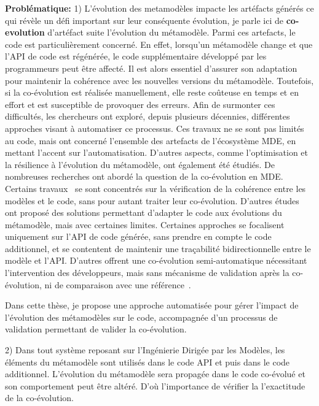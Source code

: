 \textbf{Problématique:} 1) L’évolution des metamodèles impacte les artéfacts générés ce qui révèle un défi important sur leur conséquente évolution, je parle ici de \textbf{co-evolution} d'artéfact suite  l'évolution du métamodèle. Parmi ces artefacts, le code est particulièrement concerné. En effet, lorsqu’un métamodèle change et que l’API de code est régénérée, le code supplémentaire développé par les programmeurs peut être affecté. Il est alors essentiel d’assurer son adaptation pour maintenir la cohérence avec les nouvelles versions du métamodèle. Toutefois, si la co-évolution est réalisée manuellement, elle reste coûteuse en temps et en effort et est susceptible de provoquer des erreurs.
Afin de surmonter ces difficultés, les chercheurs ont exploré, depuis plusieurs décennies, différentes approches visant à automatiser ce processus. Ces travaux ne se sont pas limités au code, mais ont concerné l’ensemble des artefacts de l’écosystème MDE, en mettant l'accent sur l’automatisation. D’autres aspects, comme l’optimisation et la résilience à l'évolution du métamodèle, ont également été étudiés. 
De nombreuses recherches ont abordé la question de la co-évolution en MDE. Certains travaux~\cite{riedl2014towards,kanakis2019empirical,pham2017bidirectional,jongeling2020towards,jongeling2022Structural,zaheri2021towards} se sont concentrés sur la vérification de la cohérence entre les modèles et le code, sans pour autant traiter leur co-évolution. D’autres études~\cite{yu2012maintaining,Khelladi2020} ont proposé des solutions permettant d’adapter le code aux évolutions du métamodèle, mais avec certaines limites. Certaines approches se focalisent uniquement sur l’API de code générée, sans prendre en compte le code additionnel, et se contentent de maintenir une traçabilité bidirectionnelle entre le modèle et l’API. D’autres offrent une co-évolution semi-automatique nécessitant l’intervention des développeurs, mais sans mécanisme de validation après la co-évolution, ni de comparaison avec une référence~\cite{9079197,10.5555/2486788.2486855,6062100,dagenais2011recommending,5070565,henkel2005catchup,10.1145/1932682.1869486,10.1145/3194793.3194798,Khelladi2020}.

Dans cette thèse, je propose une approche automatisée pour gérer l’impact de l’évolution des métamodèles sur le code, accompagnée d’un processus de validation permettant de valider la co-évolution.

2) Dans tout système reposant sur l’Ingénierie Dirigée par les Modèles, les éléments du métamodèle sont utilisés dans le code API et puis dans le code additionnel. L’évolution du métamodèle sera propagée dans le code co-évolué et son comportement peut être altéré. D’où l’importance de vérifier la l'exactitude de la co-évolution. 

